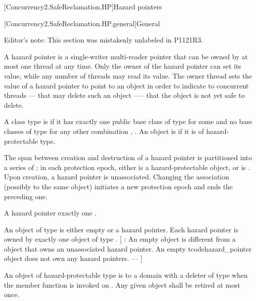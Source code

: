 
[Concurrency2.SafeReclamation.HP]{Hazard pointers}

[Concurrency2.SafeReclamation.HP.general]{General}

Editor's note: This section was mistakenly unlabeled in P1121R3.

\pnum
A hazard pointer is a single-writer multi-reader pointer that can be owned by at most one thread at any time. Only the owner of the hazard pointer can set its value, while any number of threads may read its value. The owner thread sets the value of a hazard pointer to point to an object in order to indicate to concurrent threads --- that may delete such an object --— that the object is not yet safe to delete.

\pnum
A class type  is  if it has exactly one public base class of type \linebreak {} for some  and no base classes of type  for any other combination , . An object is  if it is of hazard-protectable type.

\pnum
The span between creation and destruction of a hazard pointer  is partitioned into a series of ; in each protection epoch,  either is  a hazard-protectable object, or is . Upon creation, a hazard pointer is unassociated. Changing the association (possibly to the same object) initiates a new protection epoch and ends the preceding one.

\pnum
A hazard pointer  exactly one . 

\pnum
An object of type  is either empty or  a hazard pointer. Each hazard pointer is owned by exactly one object of type . [ : An empty  object is different from a  object that owns an unassociated hazard pointer. An empty tcode{hazard_pointer} object does not own any hazard pointers. ---  ]

\pnum
An object  of hazard-protectable type  is  to a domain with a deleter of type  when the member function  is invoked on . Any given object  shall be retired at most once.

